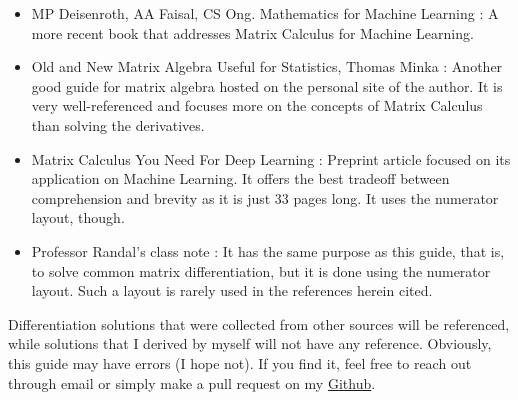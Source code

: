 \begin{itemize}
\begin{itemize}
        \item MP Deisenroth, AA Faisal, CS Ong. Mathematics for Machine Learning \cite{deisenrothMathematicsMachineLearning2020}: A more recent book that addresses Matrix Calculus for Machine Learning.
        \item Old and New Matrix Algebra Useful for Statistics, Thomas Minka \cite{ThomasMinka}: Another good guide for matrix algebra hosted on the personal site of the author. It is very well-referenced and focuses more on the concepts of Matrix Calculus than solving the derivatives.
        \item Matrix Calculus You Need For Deep Learning \cite{parrMatrixCalculusYou2018}: Preprint article focused on its application on Machine Learning. It offers the best tradeoff between comprehension and brevity as it is just 33 pages long. It uses the numerator layout, though.
        \item Professor Randal's class note \cite{barnes2006matrix}: It has the same purpose as this guide, that is, to solve common matrix differentiation, but it is done using the numerator layout. Such a layout is rarely used in the references herein cited.
\end{itemize}
\end{itemize}

Differentiation solutions that were collected from other sources will be referenced, while solutions that I derived by myself will not have any reference. Obviously, this guide may have errors (I hope not). If you find it, feel free to reach out through email or simply make a pull request on my \href{https://github.com/tapyu/tapyu.github.io/tree/master/notes/posts/matrix_diff_ref/latex}{Github}.
